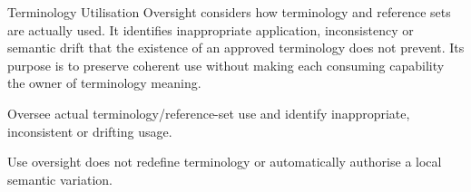Terminology Utilisation Oversight considers how terminology and reference sets are actually used. It identifies inappropriate application, inconsistency or semantic drift that the existence of an approved terminology does not prevent. Its purpose is to preserve coherent use without making each consuming capability the owner of terminology meaning.



Oversee actual terminology/\allowbreak{}reference-set use and identify inappropriate, inconsistent or drifting usage.



Use oversight does not redefine terminology or automatically authorise a local semantic variation.


